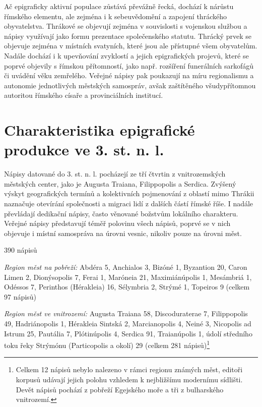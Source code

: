 Ač epigraficky aktivní populace zůstává převážně řecká, dochází k nárůstu římského elementu, ale zejména i k sebeuvědomění a zapojení thráckého obyvatelstva. Thrákové se objevují zejména v souvislosti s vojenskou službou a nápisy využívají jako formu prezentace společenského statutu. Thrácký prvek se objevuje zejména v místních svatyních, které jsou ale přístupné všem obyvatelům. Nadále dochází i k upevňování zvyklostí a jejich epigrafických projevů, které se poprvé objevily s římskou přítomností, jako např. rozšíření funerálních sarkofágů či uvádění věku zemřelého. Veřejné nápisy pak poukazují na míru regionalismu a autonomie jednotlivých městských samospráv, avšak zaštítěného všudypřítomnou autoritou římského císaře a provinciálních institucí.

\section[charakteristika-epigrafické-produkce-ve-3.-st.-n.-l.]{Charakteristika epigrafické produkce ve 3. st. n. l.}

Nápisy datované do 3. st. n. l. pocházejí ze tří čtvrtin z vnitrozemských městských center, jako je Augusta Traiana, Filippopolis a Serdica. Zvýšený výskyt geografických termínů a kolektivních pojmenování z oblastí mimo Thrákii naznačuje otevírání společnosti a migraci lidí z dalších částí římské říše. I nadále převládají dedikační nápisy, často věnované božstvům lokálního charakteru. Veřejné nápisy představují téměř polovinu všech nápisů, poprvé se v nich objevuje i místní samospráva na úrovni vesnic, nikoliv pouze na úrovni měst.

\placetable[none]{}
\starttable[|l|]
\HL
{} 390 nápisů

{\em Region měst na pobřeží:} Abdéra 5, Anchialos 3, Bizóné 1, Byzantion 20, Caron Limen 2, Dionýsopolis 7, Ferai 1, Maróneia 21, Maximiánúpolis 1, Mesámbriá 1, Odéssos 7, Perinthos (Hérakleia) 16, Sélymbria 2, Strýmé 1, Topeiros 9 (celkem 97 nápisů)

{\em Region měst ve vnitrozemí:} Augusta Traiana 58, Discoduraterae 7, Filippopolis 49, Hadriánopolis 1, Hérakleia Sintská 2, Marcianopolis 4, Neiné 3, Nicopolis ad Istrum 25, Pautália 7, Plótinúpolis 4, Serdica 91, Traianúpolis 1, údolí středního toku řeky Strýmónu (Particopolis a okolí) 29 (celkem 281 nápisů)\footnote{Celkem 12 nápisů nebylo nalezeno v rámci regionu známých měst, editoři korpusů udávají jejich polohu vzhledem k nejbližšímu modernímu sídlišti. Devět nápisů pochází z pobřeží Egejského moře a tři z bulharského vnitrozemí.}

